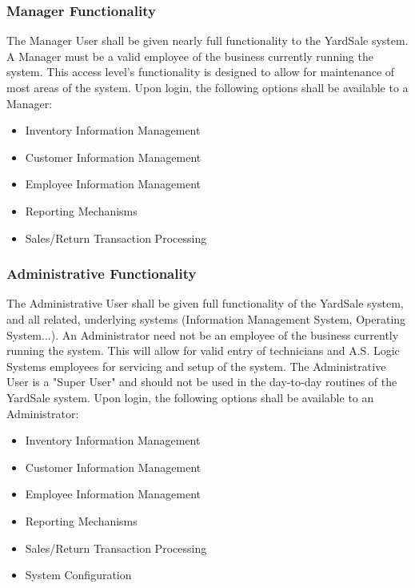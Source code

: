 \documentclass{report}
\begin{document}
            \subsubsection{Manager Functionality}
                The Manager User shall be given nearly full
                functionality to the YardSale system.  A Manager must be a
                valid employee of the business currently running the
                system.  This access level's functionality
                is designed to allow for maintenance of most
                areas of the system.  Upon login, the following options shall be
                available to a Manager:

                \begin{itemize}
                    \item Inventory Information Management
                    \item Customer Information Management
                    \item Employee Information Management
                    \item Reporting Mechanisms
                    \item Sales/Return Transaction Processing
                \end{itemize}

            \subsubsection{Administrative Functionality}
                The Administrative User shall be given full
                functionality of the YardSale system, and all
                related, underlying systems (Information Management
                System, Operating System...).  An Administrator
                need not be an employee of the business currently
                running the system.  This will allow for valid
                entry of technicians and A.S. Logic
                Systems employees for servicing and setup of the
                system.  The Administrative User is a "Super User"
                and should not be used in the day-to-day routines
                of the YardSale system.  Upon login, the following
                options shall be available to an Administrator:

                \begin{itemize}
                    \item Inventory Information Management
                    \item Customer Information Management
                    \item Employee Information Management
                    \item Reporting Mechanisms
                    \item Sales/Return Transaction Processing
                    \item System Configuration
                \end{itemize}
\end{document}
